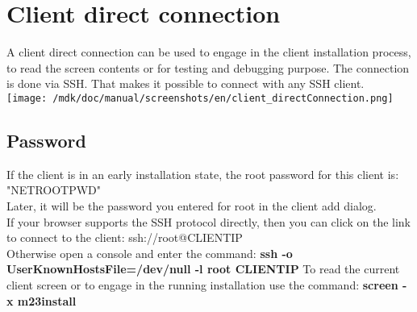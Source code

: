 \section{Client direct connection}A client direct connection can be used to engage in the client installation process, to read the screen contents or for testing and debugging purpose. The connection is done via SSH. That makes it possible to connect with any SSH client.\\
\texttt{[image: /mdk/doc/manual/screenshots/en/client\_directConnection.png]} \\
\subsection{Password}
If the client is in an early installation state, the root password for this client is: "NETROOTPWD"\\
Later, it will be the password you entered for root in the client add dialog.\\
If your browser supports the SSH protocol directly, then you can click on the link to connect to the client: ssh://root@CLIENTIP\\
Otherwise open a console and enter the command: \textbf{ssh -o UserKnownHostsFile=/dev/null -l root CLIENTIP}
To read the current client screen or to engage in the running installation use the command: \textbf{screen -x m23install}
